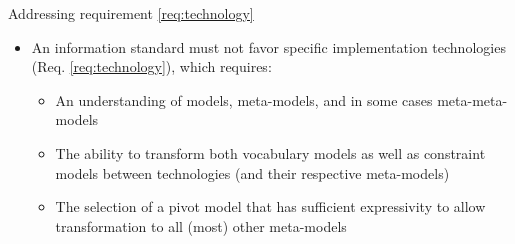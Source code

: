 \begin{frame}{Addressing requirement \ref{req:technology}}
    \begin{itemize}
        \item An information standard must not favor specific implementation technologies (Req. \ref{req:technology}), which requires:
        \begin{itemize}
            \item An understanding of models, meta-models, and in some cases meta-meta-models
            \item The ability to transform both vocabulary models as well as constraint models between technologies (and their respective meta-models)
            \item The selection of a pivot model that has sufficient expressivity to allow transformation to all (most) other meta-models
        \end{itemize}
    \end{itemize}
\end{frame}